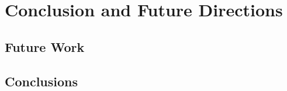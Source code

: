 
\chapter{Conclusion and Future Directions } %



\ifpdf
    \graphicspath{{6_conclusions/figures/PNG/}{6_conclusions/figures/PDF/}{6_conclusions/figures/}}
\else
    \graphicspath{{6_conclusions/figures/EPS/}{6_conclusions/figures/}}
\fi





\section{Future Work}



\section{Conclusions}




